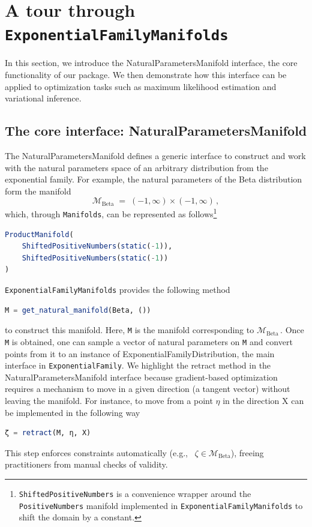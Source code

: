 \documentclass{juliacon}
\newcommand{\code}[1]{\textsf{#1}}
\begin{document}
\section{A tour through \texttt{ExponentialFamilyManifolds}}
In this section, we introduce the \code{NaturalParametersManifold} interface, the core functionality of our package. We then demonstrate how this interface can be applied to optimization tasks such as maximum likelihood estimation and variational inference.

\subsection{The core interface: \code{NaturalParametersManifold}}

The \code{NaturalParametersManifold} defines a generic interface to construct and work with the natural parameters space of an arbitrary distribution from the exponential family. For example, the natural parameters of the Beta distribution form the manifold
\[
\mathcal{M}_{\mathrm{Beta}} \;=\; (-1,\infty) \times (-1,\infty)\,,
\]
which, through \texttt{Manifolds}, can be represented as follows\footnote{\texttt{ShiftedPositiveNumbers} is a convenience wrapper around the \texttt{PositiveNumbers} manifold implemented in \texttt{ExponentialFamilyManifolds} to shift the domain by a constant.}
\begin{lstlisting}[language=Julia]
ProductManifold(
    ShiftedPositiveNumbers(static(-1)),
    ShiftedPositiveNumbers(static(-1))
)
\end{lstlisting} \texttt{ExponentialFamilyManifolds} provides the following method \begin{lstlisting}[language=Julia]
M = get_natural_manifold(Beta, ())
\end{lstlisting} to construct this manifold. Here, \texttt{M} is the manifold corresponding  to 
\(\mathcal{M}_{\mathrm{Beta}}\,.\) Once \texttt{M} is obtained, one can sample a vector of natural parameters on \texttt{M} 
and convert points from it to an instance of \code{ExponentialFamilyDistribution}, 
the main interface in \texttt{ExponentialFamily}. We highlight the \code{retract} method in the \code{NaturalParametersManifold} interface 
because gradient-based optimization requires a mechanism to move in a given direction (a tangent vector) without leaving the manifold. 
For instance, to move from a point \(\eta\) in the direction \code{X} can be implemented in the following way
\begin{lstlisting}[language=Julia]
ζ = retract(M, η, X)
\end{lstlisting}
This step enforces constraints automatically (e.g., \ \(\zeta \in \mathcal{M}_{\mathrm{Beta}}\)),
freeing practitioners from manual checks of validity.
\end{document}
